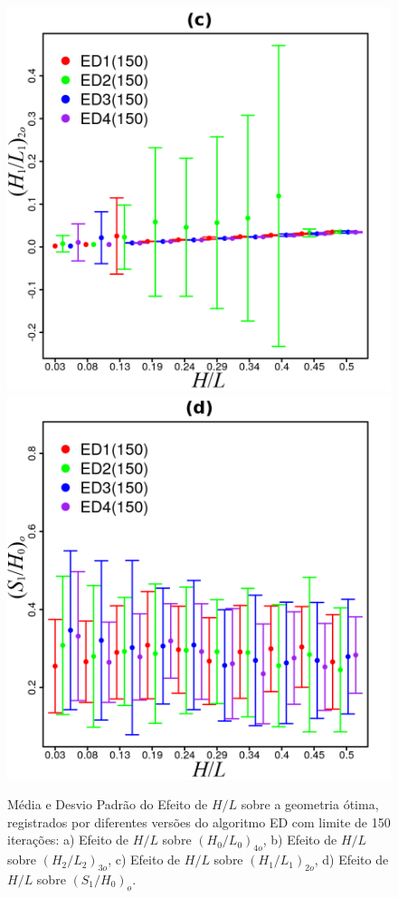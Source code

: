 \documentclass[12pt,A4,A4pt]{article}
\begin{document}
\begin{figure}[htbp]
\quad
\includegraphics[scale=.98]{imgs/plot_deall150_rdata_std_h1l1.png}
\quad
\includegraphics[scale=.98]{imgs/plot_deall150_rdata_std_s1h0.png}

\caption{\fontsize{10pt}{\baselineskip}\selectfont Média e Desvio Padrão do Efeito de $H/L$ sobre a geometria ótima, registrados por diferentes versões do algoritmo ED com limite de 150 iterações: a) Efeito de $H/L$ sobre ${(H_{0}/L_{0})_{4o}}$, b) Efeito de $H/L$ sobre ${(H_{2}/L_{2})_{3o}}$, c) Efeito de $H/L$ sobre ${(H_{1}/L_{1})_{2o}}$, d) Efeito de $H/L$ sobre ${(S_{1}/H_{0})_{o}}$.}
\label{stddegls}
\end{figure}
\end{document}

